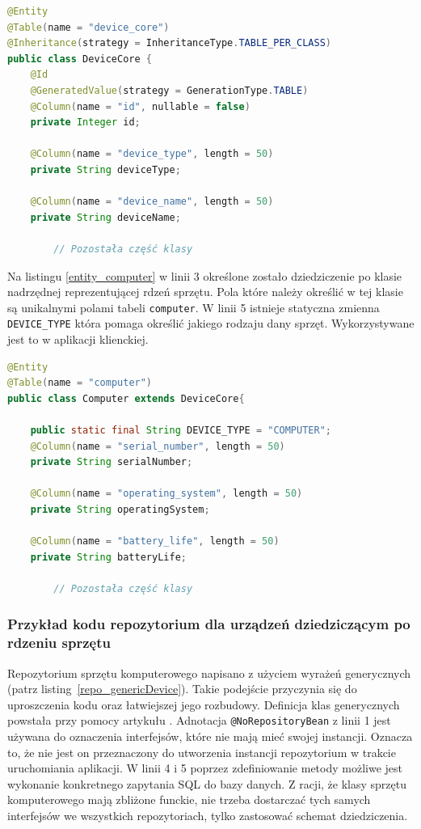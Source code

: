 \begin{lstlisting}[language=Java, style=JavaStyle, caption={Klasa nadrzędna reprezentująca rdzeń sprzętu: \texttt{DeviceCore}}, label={entity_deviceCore}]
@Entity
@Table(name = "device_core")
@Inheritance(strategy = InheritanceType.TABLE_PER_CLASS)
public class DeviceCore {
    @Id
    @GeneratedValue(strategy = GenerationType.TABLE)
    @Column(name = "id", nullable = false)
    private Integer id;

    @Column(name = "device_type", length = 50)
    private String deviceType;

    @Column(name = "device_name", length = 50)
    private String deviceName;
		
		// Pozostała część klasy
\end{lstlisting}


Na listingu \ref{entity_computer} w linii 3 określone zostało dziedziczenie po klasie nadrzędnej reprezentującej rdzeń sprzętu. Pola które należy określić w tej klasie są unikalnymi polami tabeli \texttt{computer}. W linii 5 istnieje statyczna zmienna \texttt{DEVICE\_TYPE} która pomaga określić jakiego rodzaju dany sprzęt. Wykorzystywane jest to w aplikacji klienckiej.


\begin{lstlisting}[language=Java, style=JavaStyle,  caption={Klasa potomna: Computer, reprezentująca komputer}, label={entity_computer}]
@Entity
@Table(name = "computer")
public class Computer extends DeviceCore{

    public static final String DEVICE_TYPE = "COMPUTER";
    @Column(name = "serial_number", length = 50)
    private String serialNumber;

    @Column(name = "operating_system", length = 50)
    private String operatingSystem;

    @Column(name = "battery_life", length = 50)
    private String batteryLife;
		
		// Pozostała część klasy
\end{lstlisting}


\subsubsection{Przykład kodu repozytorium dla urządzeń dziedziczącym po rdzeniu sprzętu}
Repozytorium sprzętu komputerowego napisano z użyciem wyrażeń generycznych (patrz listing~\ref{repo_genericDevice}). Takie podejście przyczynia się do uproszczenia kodu oraz łatwiejszej jego rozbudowy. Definicja klas generycznych powstała przy pomocy artykułu \cite{generics}.
Adnotacja \texttt{@NoRepositoryBean} z linii 1 jest używana do oznaczenia interfejsów, które nie mają mieć swojej instancji. Oznacza to, że nie jest on przeznaczony do utworzenia instancji repozytorium w trakcie uruchomiania aplikacji. W linii 4 i 5 poprzez zdefiniowanie metody możliwe jest wykonanie konkretnego zapytania SQL do bazy danych. Z racji, że klasy sprzętu komputerowego mają zbliżone funckie, nie trzeba dostarczać tych samych interfejsów we wszystkich repozytoriach, tylko zastosować schemat dziedziczenia.

